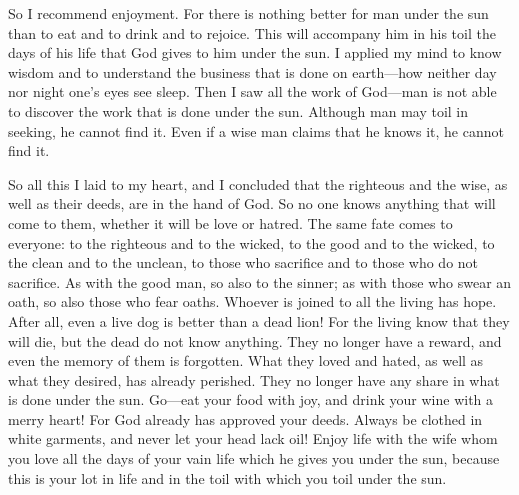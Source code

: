 \begin{biblechapter}
 So I recommend enjoyment. For there is nothing better for man under the sun than to eat and to drink and to rejoice. This will accompany him in his toil the days of his life that God gives to him under the sun.
 I applied my mind to know wisdom and to understand the business that is done on earth—how neither day nor night one’s eyes see sleep.
\verse Then I saw all the work of God—man is not able to discover the work that is done under the sun. Although man may toil in seeking, he cannot find it. Even if a wise man claims that he knows it, he cannot find it.
\end{biblechapter}

\begin{biblechapter} %
 So all this I laid to my heart, and I concluded that the righteous and the wise, as well as their deeds, are in the hand of God. So no one knows anything that will come to them, whether it will be love or hatred.
\verse The same fate comes to everyone:
\verse to the righteous and to the wicked, 
to the good and to the wicked, 
to the clean and to the unclean, 
to those who sacrifice and to those who do not sacrifice. 
As with the good man, so also to the sinner; 
as with those who swear an oath, so also those who fear oaths.
 Whoever is joined to all the living has hope. After all, even a live dog is better than a dead lion!
\verse For the living know that they will die, but the dead do not know anything. They no longer have a reward, and even the memory of them is forgotten.
\verse What they loved and hated, as well as what they desired, has already perished. They no longer have any share in what is done under the sun.
 Go—eat your food with joy, and drink your wine with a merry heart! For God already has approved your deeds.
\verse Always be clothed in white garments, and never let your head lack oil!
\verse Enjoy life with the wife whom you love all the days of your vain life which he gives you under the sun, because this is your lot in life and in the toil with which you toil under the sun.

\end{biblechapter}
